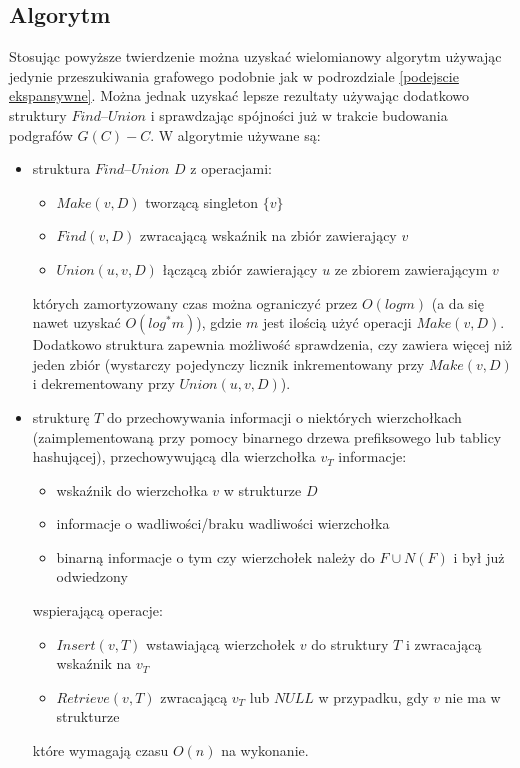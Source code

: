 \documentclass{pracamgr}
\begin{document}
   \subsection{Algorytm}
    Stosując powyższe twierdzenie można uzyskać wielomianowy algorytm używając jedynie przeszukiwania grafowego
    podobnie jak w podrozdziale \ref{podejscie ekspansywne}. Można jednak uzyskać lepsze rezultaty używając dodatkowo struktury $Find$--$Union$ i sprawdzając
    spójności już w trakcie budowania podgrafów $G(C)-C$.\newline
    W algorytmie używane są:
    \begin{itemize}[noitemsep,topsep=4pt]
     \item struktura $Find$--$Union$ $D$ z operacjami:
      \begin{itemize}[noitemsep,topsep=0pt]
       \item $Make(v,D)$ tworzącą singleton $\{v\}$
       \item $Find(v,D)$ zwracającą wskaźnik na zbiór zawierający $v$
       \item $Union(u,v,D)$ łączącą zbiór zawierający $u$ ze zbiorem zawierającym $v$
      \end{itemize}
      których zamortyzowany czas można ograniczyć przez $O(log m)$ (a da się nawet uzyskać $O(log^*m)$), gdzie $m$ jest ilością użyć
      operacji $Make(v,D)$.
      Dodatkowo struktura zapewnia możliwość sprawdzenia, czy zawiera więcej niż jeden zbiór (wystarczy pojedynczy licznik inkrementowany przy
      $Make(v,D)$ i dekrementowany przy $Union(u,v,D)$).
      \vspace*{4pt}
     \item strukturę $T$ do przechowywania informacji o niektórych wierzchołkach
     (zaimplementowaną przy pomocy binarnego drzewa prefiksowego lub tablicy hashującej),
      przechowywującą dla wierzchołka $v_T$ informacje:
      \begin{itemize}[noitemsep,topsep=0pt]
       \item wskaźnik do wierzchołka $v$ w strukturze $D$
       \item informacje o wadliwości/braku wadliwości wierzchołka
       \item binarną informacje o tym czy wierzchołek należy do $F\cup N(F)$ i był już odwiedzony
      \end{itemize}
      wspierającą operacje:
      \begin{itemize}[noitemsep,topsep=0pt]
       \item $Insert(v,T)$ wstawiającą wierzchołek $v$ do struktury $T$ i zwracającą wskaźnik na $v_T$
       \item $Retrieve(v,T)$ zwracającą $v_T$ lub $NULL$ w przypadku, gdy $v$ nie ma w strukturze
      \end{itemize}
      które wymagają czasu $O(n)$ na wykonanie.
    \end{itemize}
    
\end{document}
